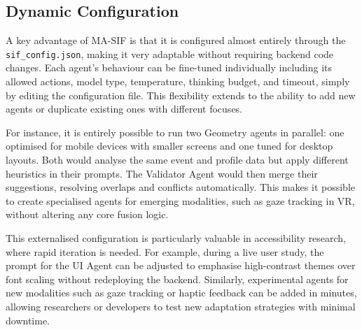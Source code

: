 \documentclass[openany]{book}
\begin{document}
\subsection{Dynamic Configuration}
A key advantage of MA-SIF is that it is configured almost entirely through the \texttt{sif\_config.json}, making it very adaptable without requiring backend code changes. Each agent’s behaviour can be fine-tuned individually including its allowed actions, model type, temperature, thinking budget, and timeout, simply by editing the configuration file. This flexibility extends to the ability to add new agents or duplicate existing ones with different focuses.

For instance, it is entirely possible to run two Geometry agents in parallel: one optimised for mobile devices with smaller screens and one tuned for desktop layouts. Both would analyse the same event and profile data but apply different heuristics in their prompts. The Validator Agent would then merge their suggestions, resolving overlaps and conflicts automatically. This makes it possible to create specialised agents for emerging modalities, such as gaze tracking in VR, without altering any core fusion logic.

This externalised configuration is particularly valuable in accessibility research, where rapid iteration is needed. 
For example, during a live user study, the prompt for the UI Agent can be adjusted to emphasise high-contrast themes over font scaling without redeploying the backend. 
Similarly, experimental agents for new modalities such as gaze tracking or haptic feedback can be added in minutes, allowing researchers or developers to test new adaptation strategies with minimal downtime.
\end{document}
